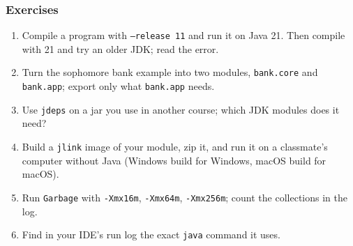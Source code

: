 \documentclass[aspectratio=169,10pt,compress]{beamer}
\begin{document}
\begin{frame}[t,fragile] \frametitle{Exercises}
  \begin{enumerate}\small
    \item Compile a program with \texttt{--release 11} and run it on Java 21. Then compile with 21 and try an older JDK; read the error.
    \item Turn the sophomore bank example into two modules, \texttt{bank.core} and \texttt{bank.app}; export only what \texttt{bank.app} needs.
    \item Use \texttt{jdeps} on a jar you use in another course; which JDK modules does it need?
    \item Build a \texttt{jlink} image of your module, zip it, and run it on a classmate's computer without Java
          (Windows build for Windows, macOS build for macOS).
    \item Run \texttt{Garbage} with \texttt{-Xmx16m}, \texttt{-Xmx64m}, \texttt{-Xmx256m}; count the collections in the log.
    \item Find in your IDE's run log the exact \texttt{java} command it uses.
  \end{enumerate}
\end{frame}




\begin{frame}[t,fragile]
	\begin{center}
		\vspace{4cm}
	\end{center}
\end{frame}
\end{document}
